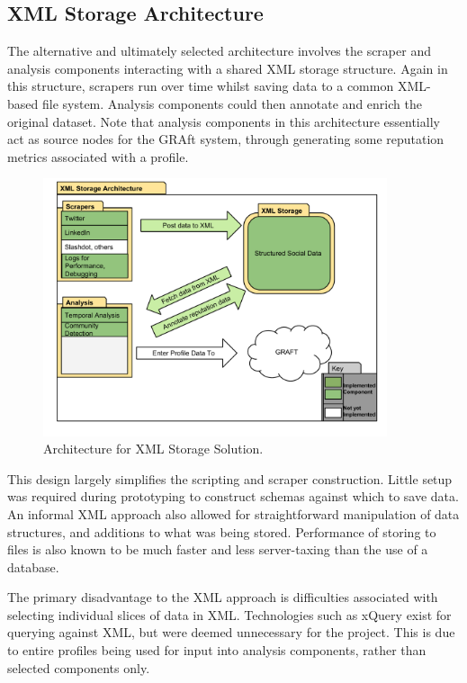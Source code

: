 \subsection{XML Storage Architecture}

The alternative and ultimately selected architecture involves the scraper and analysis components interacting with a shared XML storage structure. Again in this structure, scrapers run over time whilst saving data to a common XML-based file system. Analysis components could then annotate and enrich the original dataset. Note that analysis components in this architecture essentially act as source nodes for the GRAft system, through generating some reputation metrics associated with a profile. 

\begin{figure}[h!]
\begin{center}
\centering
\includegraphics[width=0.9\textwidth]{Images/xml_storage_arch_v2.pdf}
\caption{Architecture for XML Storage Solution.}
 \end{center}
\end{figure}
This design largely simplifies the scripting and scraper construction. Little setup was required during prototyping to construct schemas against which to save data. An informal XML approach also allowed for straightforward manipulation of data structures, and additions to what was being stored. Performance of storing to files is also known to be much faster and less server-taxing than the use of a database.

The primary disadvantage to the XML approach is difficulties associated with selecting individual slices of data in XML. Technologies such as xQuery exist for querying against XML, but were deemed unnecessary for the project. This is due to entire profiles being used for input into analysis components, rather than selected components only.

